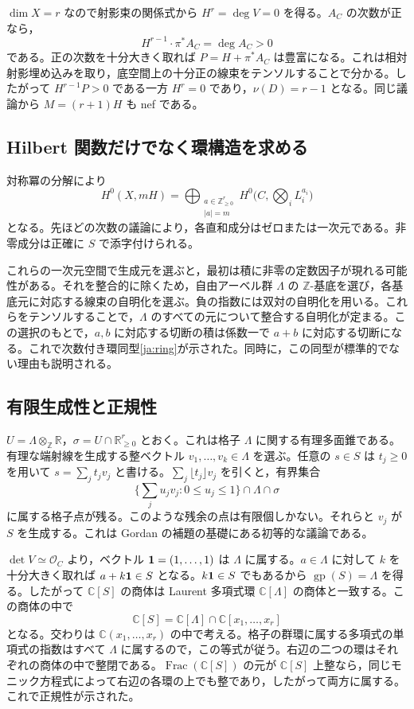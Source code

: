 \documentclass[12pt]{amsart}
\theoremstyle{definition}
\theoremstyle{remark}
\numberwithin{equation}{section}
\newcommand{\cO}{\mathcal{O}}
\newcommand{\R}{\mathbb{R}}
\newcommand{\Z}{\mathbb{Z}}
\newcommand{\C}{\mathbb{C}}
\DeclareMathOperator{\gp}{gp}
\newcommand{\NN}{\mathbb Z_{\geq0}}
\begin{document}
$\dim X=r$ なので射影束の関係式から $H^r=\deg V=0$ を得る。$A_C$ の次数が正なら，
\[
 H^{r-1}\cdot\pi^*A_C=\deg A_C>0
\]
である。正の次数を十分大きく取れば $P=H+\pi^*A_C$ は豊富になる。これは相対射影埋め込みを取り，底空間上の十分正の線束をテンソルすることで分かる。したがって $H^{r-1}P>0$ である一方 $H^r=0$ であり，$\nu(D)=r-1$ となる。同じ議論から $M=(r+1)H$ も nef である。

\subsection{Hilbert 関数だけでなく環構造を求める}
対称冪の分解により
\begin{equation}\label{ja:symmetric}
 H^0(X,mH)=
 \bigoplus_{\substack{a\in\NN^r\\ |a|=m}}
 H^0\bigl(C,\textstyle\bigotimes_i L_i^{a_i}\bigr)
\end{equation}
となる。先ほどの次数の議論により，各直和成分はゼロまたは一次元である。非零成分は正確に $S$ で添字付けられる。

これらの一次元空間で生成元を選ぶと，最初は積に非零の定数因子が現れる可能性がある。それを整合的に除くため，自由アーベル群 $\Lambda$ の $\Z$-基底を選び，各基底元に対応する線束の自明化を選ぶ。負の指数には双対の自明化を用いる。これらをテンソルすることで，$\Lambda$ のすべての元について整合する自明化が定まる。この選択のもとで，$a,b$ に対応する切断の積は係数一で $a+b$ に対応する切断になる。これで次数付き環同型\eqref{ja:ring}が示された。同時に，この同型が標準的でない理由も説明される。

\subsection{有限生成性と正規性}
$U=\Lambda\otimes_\Z\R$，$\sigma=U\cap\R_{\geq0}^r$ とおく。これは格子 $\Lambda$ に関する有理多面錐である。有理な端射線を生成する整ベクトル $v_1,\ldots,v_k\in\Lambda$ を選ぶ。任意の $s\in S$ は $t_j\geq0$ を用いて $s=\sum_j t_jv_j$ と書ける。$\sum_j\lfloor t_j\rfloor v_j$ を引くと，有界集合
\[
 \bigl\{\textstyle\sum_j u_jv_j:0\leq u_j\leq1\bigr\}\cap\Lambda\cap\sigma
\]
に属する格子点が残る。このような残余の点は有限個しかない。それらと $v_j$ が $S$ を生成する。これは Gordan の補題の基礎にある初等的な議論である。

$\det V\simeq\cO_C$ より，ベクトル ${\bf1}=(1,\ldots,1)$ は $\Lambda$ に属する。$a\in\Lambda$ に対して $k$ を十分大きく取れば $a+k{\bf1}\in S$ となる。$k{\bf1}\in S$ でもあるから $\gp(S)=\Lambda$ を得る。したがって $\C[S]$ の商体は Laurent 多項式環 $\C[\Lambda]$ の商体と一致する。この商体の中で
\[
 \C[S]=\C[\Lambda]\cap\C[x_1,\ldots,x_r]
\]
となる。交わりは $\C(x_1,\ldots,x_r)$ の中で考える。格子の群環に属する多項式の単項式の指数はすべて $\Lambda$ に属するので，この等式が従う。右辺の二つの環はそれぞれの商体の中で整閉である。$\operatorname{Frac}(\C[S])$ の元が $\C[S]$ 上整なら，同じモニック方程式によって右辺の各環の上でも整であり，したがって両方に属する。これで正規性が示された。
\end{document}
